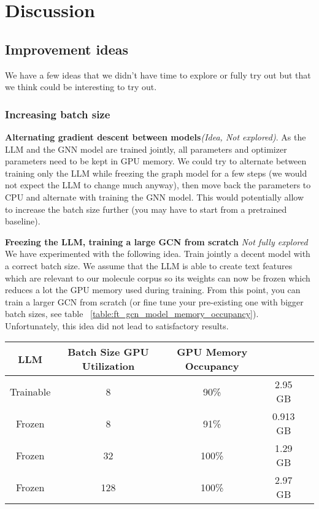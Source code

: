 \section{Discussion}
\label{sec:discussion}

\subsection*{Improvement ideas}
\label{sec:unexplored_ideas}
We have a few ideas that we didn't have time to explore or fully try out but that we think could be interesting to try out.

\subsubsection*{Increasing batch size}
\textbf{Alternating gradient descent between models}\textit{(Idea, Not explored)}. As the LLM and the GNN model are trained jointly, all parameters and optimizer parameters need to be kept in GPU memory. We could try to alternate between training only the LLM while freezing the graph model for a few steps (we would not expect the LLM to change much anyway), then move back the parameters to CPU and alternate with training the GNN model. This would potentially allow to increase the batch size further (you may have to start from a pretrained baseline).

\textbf{Freezing the LLM, training a large GCN from scratch} \textit{Not fully explored}
We have experimented with the following idea. Train jointly a decent model with a correct batch size. We assume that the LLM is able to create text features which are relevant to our molecule corpus so its weights can now be frozen which reduces a lot the GPU memory used during training. From this point, you can train a larger GCN from scratch (or fine tune your pre-existing one with bigger batch sizes, see table ~\ref{table:ft_gcn_model_memory_occupancy}). Unfortunately, this idea did not lead to satisfactory results.

\begin{table*}[ht]
    \centering
    \begin{tabular}{ccccc}
    \hline
    \textbf{LLM} & \textbf{Batch Size} \textbf{GPU Utilization}& \textbf{GPU Memory Occupancy} \\ \hline
    Trainable & 8 & 90\% & 2.95 GB \\
    Frozen & 8 & 91\% & 0.913 GB \\
    Frozen & 32 & 100\% & 1.29 GB \\
    Frozen & 128 & 100\% & 2.97 GB \\
    \hline
    \end{tabular}
    \caption{Comparison of memory occupancy for different model configurations on NVIDIA T500 with 4GB of GPU Memory. GCN Model is the FatGCN. LLM is a SciBERT model that we trained from scratch with LORA. This allows putting much larger batch sizes in the GCN model (from batches of size 8 when training LLM and GCN jointly to 128 - please note that the trainable LLM memory in the first row is already reduced a lot by using LoRA compared to traing all parameters at once).}
    \label{table:ft_gcn_model_memory_occupancy}
\end{table*}

    